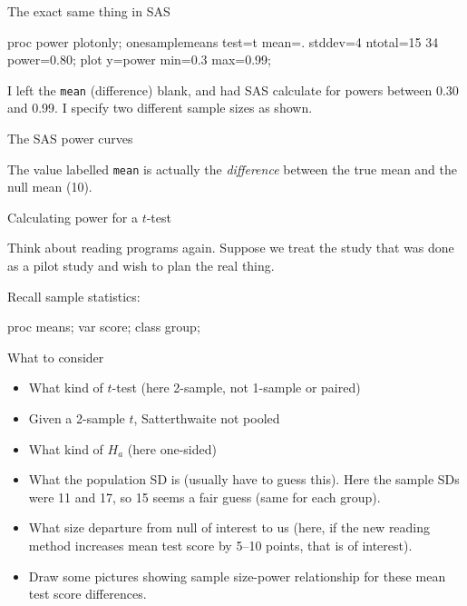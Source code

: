 \documentclass[unknownkeysallowed]{beamer}\usepackage[]{graphicx}\usepackage[]{color}
\begin{document}
\begin{frame}[fragile]{The exact same thing in SAS}
  
  \begin{Sascode}[store=pe]
  proc power plotonly;
    onesamplemeans
      test=t
      mean=.
      stddev=4
      ntotal=15 34
      power=0.80;
    plot y=power min=0.3 max=0.99;    
  \end{Sascode}
  
  I left the \texttt{mean} (difference) blank, and had SAS calculate
  for powers between 0.30 and 0.99. I specify two different sample
  sizes as shown.
  
\end{frame}

\begin{frame}[fragile]{The SAS power curves}
  
  
The value labelled \texttt{mean} is actually the \emph{difference}
between the true mean and the null mean (10).
\end{frame}


\begin{frame}[fragile]{Calculating power for a $t$-test}

  
Think about reading programs again. Suppose we treat the study that
was done as a pilot study and wish to plan the real thing.

Recall sample statistics:

\begin{Sascode}[store=ph]
proc means;
  var score;
  class group;
\end{Sascode}




\end{frame}

\begin{frame}[fragile]{What to consider}

    \begin{itemize}
  \item What kind of $t$-test (here 2-sample, not 1-sample or paired)
  \item Given a 2-sample $t$, Satterthwaite not pooled
  \item What kind of $H_a$ (here one-sided)
  \item What the population SD is (usually have to guess this). Here
    the sample SDs were 11 and 17, so 15 seems a fair guess (same for
    each group).
  \item What size departure from null of interest to us (here, if the
    new reading method increases mean test score by 5--10 points, that
    is of interest). 
    
    \item Draw some pictures showing sample size-power relationship
      for these mean test score differences.
  \end{itemize}

\end{frame}
\end{document}
